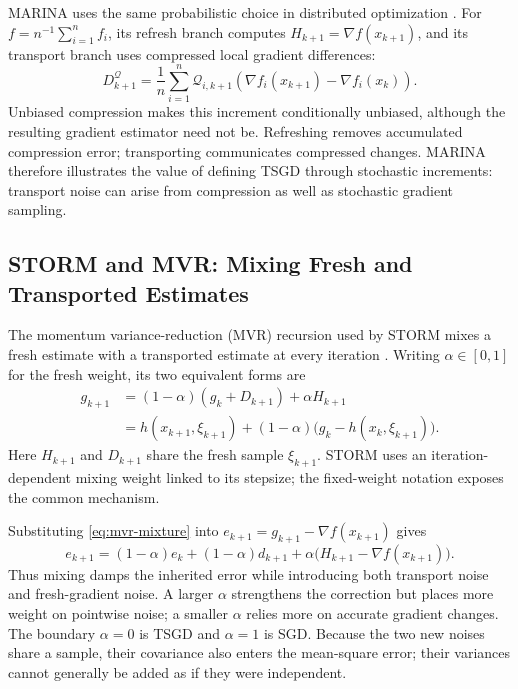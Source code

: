 MARINA uses the same probabilistic choice in distributed optimization
\citep{gorbunov2021marina}. For $f=n^{-1}\sum_{i=1}^n f_i$, its refresh
branch computes $H_{k+1}=\nabla f(x_{k+1})$, and its transport branch
uses compressed local gradient differences:
\begin{equation}
\label{eq:marina-increment}
D_{k+1}^{\mathcal Q}
=\frac1n\sum_{i=1}^n
\mathcal Q_{i,k+1}\!\left(
\nabla f_i(x_{k+1})-\nabla f_i(x_k)\right).
\end{equation}
Unbiased compression makes this increment conditionally unbiased,
although the resulting gradient estimator need not be. Refreshing
removes accumulated compression error; transporting communicates
compressed changes. MARINA therefore illustrates the value of defining
TSGD through stochastic increments: transport noise can arise from
compression as well as stochastic gradient sampling.

\subsection{STORM and MVR: Mixing Fresh and Transported Estimates}
\label{subsec:mixing-estimates}

The momentum variance-reduction (MVR) recursion used by STORM mixes a
fresh estimate with a transported estimate at every iteration
\citep{cutkosky2019momentum}. Writing $\alpha\in[0,1]$ for the fresh
weight, its two equivalent forms are
\begin{equation}
\label{eq:mvr-mixture}
\begin{aligned}
g_{k+1}
&=(1-\alpha)(g_k+D_{k+1})+\alpha H_{k+1}\\
&=h(x_{k+1},\xi_{k+1})
 +(1-\alpha)\bigl(g_k-h(x_k,\xi_{k+1})\bigr).
\end{aligned}
\end{equation}
Here $H_{k+1}$ and $D_{k+1}$ share the fresh sample $\xi_{k+1}$.
STORM uses an iteration-dependent mixing weight linked to its
stepsize; the fixed-weight notation exposes the common mechanism.

Substituting \eqref{eq:mvr-mixture} into
$e_{k+1}=g_{k+1}-\nabla f(x_{k+1})$ gives
\begin{equation}
\label{eq:mvr-error-recursion}
e_{k+1}=(1-\alpha)e_k+(1-\alpha)d_{k+1}
 +\alpha\bigl(H_{k+1}-\nabla f(x_{k+1})\bigr).
\end{equation}
Thus mixing damps the inherited error while introducing both transport
noise and fresh-gradient noise. A larger $\alpha$ strengthens the
correction but places more weight on pointwise noise; a smaller
$\alpha$ relies more on accurate gradient changes. The boundary
$\alpha=0$ is TSGD and $\alpha=1$ is SGD. Because the two new noises
share a sample, their covariance also enters the mean-square error;
their variances cannot generally be added as if they were independent.

